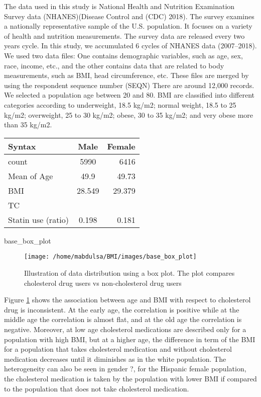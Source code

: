 \documentclass[
  12pt,
]{article}
\begin{document}
The data used in this study is National Health and Nutrition Examination Survey data (NHANES)(Disease Control and (CDC) 2018). The survey examines a nationally representative sample of the U.S. population. It focuses on a variety of health and nutrition measurements. The survey data are released every two years cycle. In this study, we accumulated 6 cycles of NHANES data (2007--2018). We used two data files: One contains demographic variables, such as age, sex, race, income, etc., and the other contains data that are related to body measurements, such as BMI, head circumference, etc. These files are merged by using the respondent sequence number (SEQN)
There are around 12,000 records. We selected a population age between 20 and 80.
BMI are classified into different categories according to underweight, 18.5 kg/m2; normal weight, 18.5 to 25 kg/m2; overweight, 25 to 30 kg/m2; obese, 30 to 35 kg/m2; and very obese more than 35 kg/m2.

\begin{longtable}[]{@{}lcr@{}}
\toprule
Syntax & Male & Female\tabularnewline
\midrule
\endhead
count & 5990 & 6416\tabularnewline
Mean of Age & 49.9 & 49.73\tabularnewline
BMI & 28.549 & 29.379\tabularnewline
TC & &\tabularnewline
Statin use (ratio) & 0.198 & 0.181\tabularnewline
\bottomrule
\end{longtable}

base\_box\_plot

\begin{figure}

{\centering \texttt{[image: /home/mabdulsa/BMI/images/base\_box\_plot]} 

}

\caption{Illustration of data distribution using a box plot. The plot compares cholesterol drug users vs non-cholesterol drug users}\label{fig:box}
\end{figure}

Figure \ref{fig:box} shows the association between age and BMI with respect to cholesterol drug is inconsistent. At the early age, the correlation is positive while at the middle age the correlation is almost flat, and at the old age the correlation is negative. Moreover, at low age cholesterol medications are described only for a population with high BMI, but at a higher age, the difference in term of the BMI for a population that takes cholesterol medication and without cholesterol medication decreases until it diminishes as in the white population. The heterogeneity can also be seen in gender ?, for the Hispanic female population, the cholesterol medication is taken by the population with lower BMI if compared to the population that does not take cholesterol medication.
\end{document}
